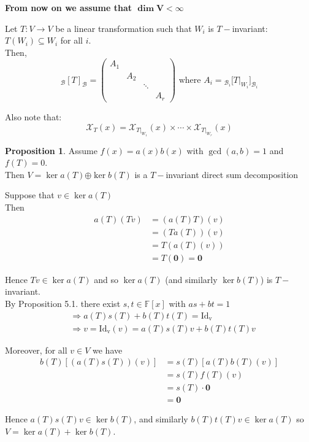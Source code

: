 \documentclass[11pt, a4paper]{report}
\makeatletter
\numberwithin{equation}{section}
\renewcommand{\chi}{\mathcal{X}}
\newcommand{\opl}{\boldsymbol{\oplus}}
\newcommand{\F}{\mathbb{F}}
\newcommand{\pmx}[1]{\begin{pmatrix}#1\end{pmatrix}}
\numberwithin{equation}{subsection}
\theoremstyle{plain}
\theoremstyle{definition}
\newtheorem{prop}[thm]{Proposition}
\theoremstyle{remark}
\newtheorem*{prf}{Proof}
\renewenvironment{prf}[1][\proofname]{\par
  \vspace{-\topsep}%
  \normalfont
  \topsep0pt \partopsep0pt %
  \trivlist
  \item[\hskip\labelsep
        \itshape
    #1\@addpunct{.}]\ignorespaces
}{%
  \popQED\endtrivlist\@endpefalse
  \addvspace{6pt plus 6pt} %
}
\newcommand{\pr}[1]{\begin{adjustwidth}{1cm}{} \begin{prf} #1 \end{prf} \end{adjustwidth}}
\makeatother
\begin{document}
\textbf{From now on we assume that $\boldsymbol{\dim V < \infty}$}

Let $T: V \to V$ be a linear transformation such that $W_i$ is $T-$invariant: $T(W_i) \subseteq W_i$ for all $i$.\\
Then,
\[
_\mathcal{B}[T]_\mathcal{B} = \pmx{A_1 \\ & A_2 \\ & & \ddots \\ & & & A_r }
\text{ where } A_i = {_{\mathcal{B}_i}[}T|_{W_i}]_{\mathcal{B}_i}
\]

Also note that:
$$ \chi_T (x) = \chi_{T|_{W_1}}(x) \times \cdots \times \chi_{T|_{W_r}}(x) $$

\begin{prop} Assume $f(x) = a(x)b(x)$ with $\gcd(a,b) = 1$ and $f(T) = 0$.\\ Then $V = \ker a(T) \opl \ker b(T)$ is a $T-$invariant direct sum decomposition 

\pr{
Suppose that $v \in \ker a(T)$\\
Then
\begin{align*}
a(T)(Tv) 	&= (a(T)T)(v)\\ 	
			&= (Ta(T))(v)\\
			&= T(a(T)(v))\\
			&= T(\boldsymbol{0}) = \boldsymbol{0}
\end{align*}

Hence $Tv \in \ker a(T)$ and so $\ker a(T)$ (and similarly $\ker b(T)$) is $T-$invariant.\\
By Proposition 5.1. there exist $s,t \in \F[x]$ with $as + bt = 1$
\begin{align*}
&\Rightarrow a(T)s(T) + b(T)t(T) = \mathrm{Id_v}\\
&\Rightarrow v = \mathrm{Id_v}(v) = a(T)s(T)v + b(T)t(T)v \tag{$*$}
\end{align*}\vspace*{-32pt}

Moreover, for all $v \in V$ we have
\begin{align*}
b(T)[(a(T)s(T))(v)] &= s(T)[a(T)b(T)(v)]\\
					&= s(T)f(T)(v) \tag{$ab = f$}\\
					&= s(T) \cdot \boldsymbol{0} \tag{$f(T) = 0$}\\
					&= \boldsymbol{0}
\end{align*}

Hence $a(T)s(T)v \in \ker b(T)$, and similarly $b(T)t(T)v \in \ker a(T)$ so $V = \ker a(T) + \ker b(T)$.

}
\end{prop}
\end{document}
